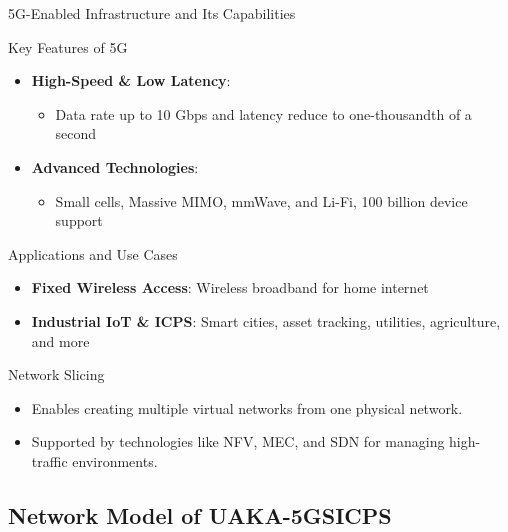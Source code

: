 \documentclass[9pt,handout]{beamer}
\begin{document}
\begin{frame}{5G-Enabled Infrastructure and Its Capabilities}

\begin{block}{Key Features of 5G}
    \begin{itemize}
        \item \textbf{High-Speed \& Low Latency}:
            \begin{itemize}
                \item Data rate up to 10 Gbps and latency reduce to one-thousandth of a second
            \end{itemize}
        \item \textbf{Advanced Technologies}:
            \begin{itemize}
                \item Small cells, Massive MIMO, mmWave, and Li-Fi, 100 billion device support
            \end{itemize}
    \end{itemize}
\end{block}

\begin{block}{Applications and Use Cases}
    \begin{itemize}
        \item \textbf{Fixed Wireless Access}: Wireless broadband for home internet
        \item \textbf{Industrial IoT \& ICPS}: Smart cities, asset tracking, utilities, agriculture, and more
    \end{itemize}
\end{block}

\begin{block}{Network Slicing}
    \begin{itemize}
        \item Enables creating multiple virtual networks from one physical network.
        \item Supported by technologies like NFV, MEC, and SDN for managing high-traffic environments.
    \end{itemize}
\end{block}

\end{frame}
\subsection{Network Model of UAKA-5GSICPS}
\end{document}

